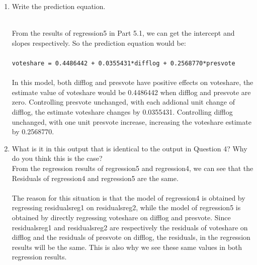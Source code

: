 \documentclass[12pt,letterpaper]{article}
\begin{document}
\begin{enumerate}
		\newpage
		\item Write the prediction equation.	\vspace{.15cm}
		
		\noindent \\From the results of regression5 in Part 5.1, we can get the intercept and slopes respectively. So the prediction equation would be:\\  \\ \texttt{voteshare = 0.4486442 + 0.0355431*difflog + 0.2568770*presvote} \\  \\In this model, both difflog and presvote have positive effects on voteshare, the estimate value of voteshare would be 0.4486442 when difflog and presvote are zero. Controlling presvote unchanged, with each addional unit change of difflog, the estimate voteshare changes by 0.0355431. Controlling difflog unchanged, with one unit presvote  increase, increasing the voteshare estimate by 0.2568770.\\
		
		\item What is it in this output that is identical to the output in Question 4? Why do you think this is the case?\\
		
		\noindent From the regression results of regression5 and regression4, we can see that the Residuals of regression4 and regression5 are the same.\\
		\\The reason for this situation is that the model of regression4 is obtained by regressing residuals\textunderscore{}reg1 on residuals\textunderscore{}reg2, while the model of regression5 is obtained by directly regressing voteshare on difflog and presvote. Since residuals\textunderscore{}reg1 and residuals\textunderscore{}reg2 are respectively the residuals of voteshare on difflog and the residuals of presvote on difflog, the residuals,  in the regression results will be the same. This is also why we see these same values in both regression results.
		
	\end{enumerate}
\end{document}
